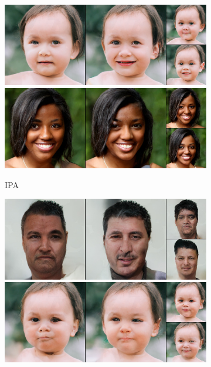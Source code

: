\begin{figure}[t]
\begin{subfigure}[t]{0.25\textwidth}
      \includegraphics[height=\ffhqimgheight]{figs/cigcvae/image-samples/ffhq256/freeform_aipo_13_samples.jpg}
      \includegraphics[height=\ffhqimgheight]{figs/cigcvae/image-samples/ffhq256/freeform_aipo_32_samples.jpg}
      \caption{IPA}
    \end{subfigure}
    \begin{subfigure}[t]{0.25\textwidth}
      \centering
      \includegraphics[height=\ffhqimgheight]{figs/cigcvae/image-samples/ffhq256/freeform_aipo-r_0_samples.jpg}
      \includegraphics[height=\ffhqimgheight]{figs/cigcvae/image-samples/ffhq256/freeform_aipo-r_13_samples.jpg}

\end{subfigure}
\end{figure}

